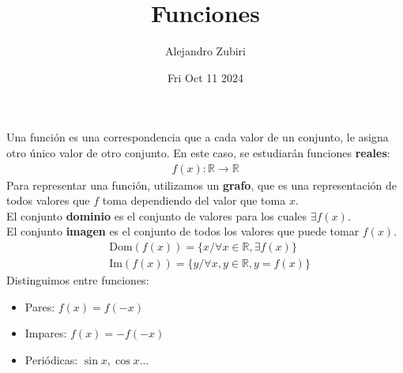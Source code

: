 \documentclass{article}
\author{Alejandro Zubiri}
\date{Fri Oct 11 2024}
\title{Funciones}
\begin{document}
\maketitle
Una función es una correspondencia que a cada valor de un conjunto, le asigna otro único valor de otro conjunto. En este
caso, se estudiarán funciones \textbf{reales}:
\begin{equation}
    \begin{split}
        f(x): \mathbb{R} \to \mathbb{R}
    \end{split}
\end{equation}
Para representar una función, utilizamos un \textbf{grafo}, que es una representación de todos valores que $f$ toma
dependiendo del valor que toma $x$.\\
El conjunto \textbf{dominio} es el conjunto de valores para los cuales $\exists f(x)$.\\
El conjunto \textbf{imagen} es el conjunto de todos los valores que puede tomar $f(x)$.
\begin{equation}
    \begin{split}
        &\mathrm{Dom}(f(x))= \{ x / \forall x \in \mathbb{R}, \exists f(x) \}\\
        &\mathrm{Im}(f(x))= \{ y / \forall x,y \in \mathbb{R}, y=f(x) \} 
    \end{split}
\end{equation}
Distinguimos entre funciones:
\begin{itemize}
    \item Pares: $f(x) = f(-x)$
    \item Impares: $f(x)=-f(-x)$
    \item Periódicas: $\sin x, \cos x\dots$ 
\end{itemize}
\pagebreak
\end{document}
